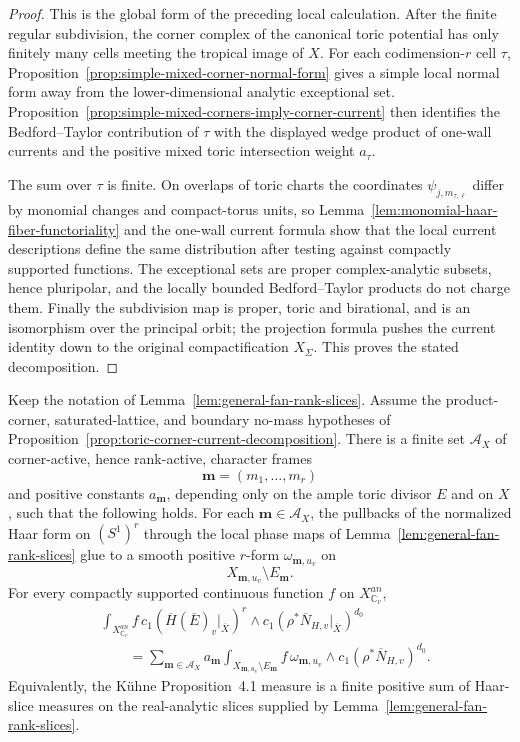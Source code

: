 \documentclass[10pt,a4paper]{amsart}
\theoremstyle{plain}
\theoremstyle{plain}
\numberwithin{equation}{section}
\providecommand{\bN}{\overline{N}}
\providecommand{\bE}{\overline{E}}
\begin{document}
\begin{proof}
	This is the global form of the preceding local calculation.  After the finite
	regular subdivision, the corner complex of the canonical toric potential has
	only finitely many cells meeting the tropical image of \(X\).  For each
	codimension-\(r\) cell \(\tau\), Proposition~\ref{prop:simple-mixed-corner-normal-form}
	gives a simple local normal form away from the lower-dimensional analytic
	exceptional set.  Proposition~\ref{prop:simple-mixed-corners-imply-corner-current}
	then identifies the Bedford--Taylor contribution of \(\tau\) with the
	displayed wedge product of one-wall currents and the positive mixed toric
	intersection weight \(a_\tau\).
	
	The sum over \(\tau\) is finite.  On overlaps of toric charts the coordinates
	\(\psi_{j,m_{\tau,\ell}}\) differ by monomial changes and compact-torus units,
	so Lemma~\ref{lem:monomial-haar-fiber-functoriality} and the one-wall current
	formula show that the local current descriptions define the same distribution
	after testing against compactly supported functions.  The exceptional sets are
	proper complex-analytic subsets, hence pluripolar, and the locally bounded
	Bedford--Taylor products do not charge them.  Finally the subdivision map is
	proper, toric and birational, and is an isomorphism over the principal orbit;
	the projection formula pushes the current identity down to the original
	compactification \(X_\Sigma\).  This proves the stated decomposition.
\end{proof}

\begin{prop}
	\label{input:general-fan-curvature-haar-slice}
	Keep the notation of Lemma~\ref{lem:general-fan-rank-slices}.  Assume the
	product-corner, saturated-lattice, and boundary no-mass hypotheses of
	Proposition~\ref{prop:toric-corner-current-decomposition}.  There is a
	finite set \(\mathcal A_X\) of corner-active, hence rank-active, character
	frames
	\[
	\mathbf m=(m_1,\ldots,m_r)
	\]
	and positive constants \(a_{\mathbf m}\), depending only on the ample toric
	divisor \(E\) and on \(X\), such that the following holds.  For each
	\(\mathbf m\in\mathcal A_X\), the pullbacks of the normalized Haar form on
	\((S^1)^r\) through the local phase maps of
	Lemma~\ref{lem:general-fan-rank-slices} glue to a smooth positive
	\(r\)-form \(\omega_{\mathbf m,u_v}\) on
	\[
	X_{\mathbf m,u_v}\setminus E_{\mathbf m}.
	\]
	For every compactly supported continuous function
	\(f\) on \(X^{an}_{\mathbb C_v}\),
	\[
	\begin{aligned}
		&\int_{X^{an}_{\mathbb C_v}}
		f\,
		c_1(\overline H(\bE)_v|_{\overline X})^{r}
		\wedge c_1(\rho^*\bN_{H,v}|_{\overline X})^{d_0} \\
		&\qquad =
		\sum_{\mathbf m\in\mathcal A_X} a_{\mathbf m}
		\int_{X_{\mathbf m,u_v}\setminus E_{\mathbf m}}
		f\,
		\omega_{\mathbf m,u_v}
		\wedge c_1(\rho^*\bN_{H,v})^{d_0}.
	\end{aligned}
	\]
	Equivalently, the K\"uhne Proposition~4.1 measure is a finite positive sum of
	Haar-slice measures on the real-analytic slices supplied by
	Lemma~\ref{lem:general-fan-rank-slices}.
\end{prop}
\end{document}
